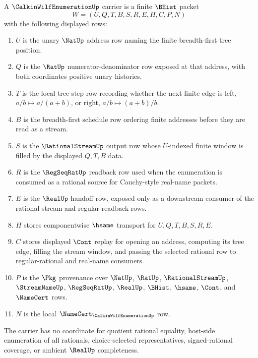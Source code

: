 \begin{definition}
\label{def:calkin-wilf-enumeration-carrier}
A $\CalkinWilfEnumerationUp$ carrier is a finite $\BHist$ packet
$$
W=(U,Q,T,B,S,R,E,H,C,P,N)
$$
with the following displayed rows:
\begin{enumerate}
\item $U$ is the unary $\NatUp$ address row naming the finite breadth-first
tree position.
\item $Q$ is the $\RatUp$ numerator-denominator row exposed at that address,
with both coordinates positive unary histories.
\item $T$ is the local tree-step row recording whether the next finite edge is
left, $a/b \mapsto a/(a+b)$, or right, $a/b \mapsto (a+b)/b$.
\item $B$ is the breadth-first schedule row ordering finite addresses before
they are read as a stream.
\item $S$ is the $\RationalStreamUp$ output row whose $U$-indexed finite
window is filled by the displayed $Q,T,B$ data.
\item $R$ is the $\RegSeqRatUp$ readback row used when the enumeration is
consumed as a rational source for Cauchy-style real-name packets.
\item $E$ is the $\RealUp$ handoff row, exposed only as a downstream consumer
of the rational stream and regular readback rows.
\item $H$ stores componentwise $\hsame$ transport for $U,Q,T,B,S,R,E$.
\item $C$ stores displayed $\Cont$ replay for opening an address, computing its
tree edge, filling the stream window, and passing the selected rational row to
regular-rational and real-name consumers.
\item $P$ is the $\Pkg$ provenance over $\NatUp$, $\RatUp$,
$\RationalStreamUp$, $\StreamNameUp$, $\RegSeqRatUp$, $\RealUp$, $\BHist$,
$\hsame$, $\Cont$, and $\NameCert$ rows.
\item $N$ is the local $\NameCert_{\CalkinWilfEnumerationUp}$ row.
\end{enumerate}
The carrier has no coordinate for quotient rational equality, host-side
enumeration of all rationals, choice-selected representatives, signed-rational
coverage, or ambient $\RealUp$ completeness.
\end{definition}

